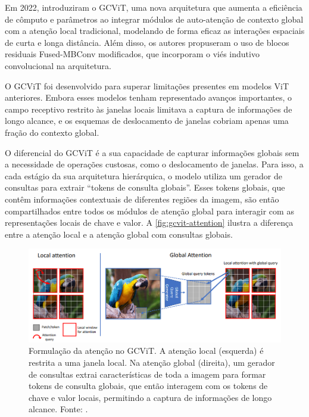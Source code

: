 Em 2022,  introduziram o GCViT, uma nova arquitetura que aumenta a eficiência de cômputo e parâmetros ao integrar módulos de auto-atenção de contexto global com a atenção local tradicional, modelando de forma eficaz as interações espaciais de curta e longa distância. Além disso, os autores propuseram o uso de blocos residuais Fused-MBConv modificados, que incorporam o viés indutivo convolucional na arquitetura.

O GCViT foi desenvolvido para superar limitações presentes em modelos ViT anteriores. Embora esses modelos tenham representado avanços importantes, o campo receptivo restrito às janelas locais limitava a captura de informações de longo alcance, e os esquemas de deslocamento de janelas cobriam apenas uma fração do contexto global.

O diferencial do GCViT é a sua capacidade de capturar informações globais sem a necessidade de operações custosas, como o deslocamento de janelas. Para isso, a cada estágio da sua arquitetura hierárquica, o modelo utiliza um gerador de consultas para extrair ``tokens de consulta globais''. Esses tokens globais, que contêm informações contextuais de diferentes regiões da imagem, são então compartilhados entre todos os módulos de atenção global para interagir com as representações locais de chave e valor. A \autoref{fig:gcvit-attention} ilustra a diferença entre a atenção local e a atenção global com consultas globais.

\begin{figure}[!htbp]
    \centering
    \includegraphics[width=\linewidth]{figs/gcvit-attention.png}
    \caption{Formulação da atenção no GCViT. A atenção local (esquerda) é restrita a uma janela local. Na atenção global (direita), um gerador de consultas extrai características de toda a imagem para formar tokens de consulta globais, que então interagem com os tokens de chave e valor locais, permitindo a captura de informações de longo alcance. Fonte: .}
    \label{fig:gcvit-attention}
\end{figure}

